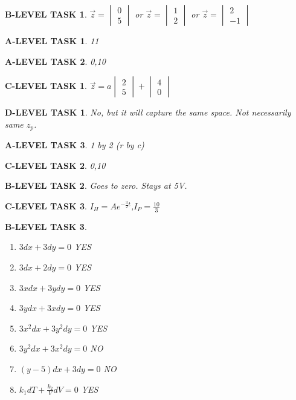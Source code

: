 \documentclass{book}
\numberwithin{equation}{section}
\newtheorem{alevel}{A-LEVEL TASK}
\newtheorem{blevel}{B-LEVEL TASK}
\newtheorem{clevel}{C-LEVEL TASK}
\newtheorem{dlevel}{D-LEVEL TASK}
\theoremstyle{definition}
\begin{document}
\begin{blevel}
$\vec{z}= \begin{vmatrix}0\\5\end{vmatrix}$ or
$\vec{z}= \begin{vmatrix}1\\2\end{vmatrix}$ or 
$\vec{z}= \begin{vmatrix}2\\-1\end{vmatrix}$ 
\end{blevel}
\begin{alevel}11\end{alevel}
\begin{alevel}0,10\end{alevel}
\begin{clevel}$\vec{z}= a\begin{vmatrix}2\\5\end{vmatrix}+\begin{vmatrix}4\\0\end{vmatrix}$ \end{clevel}

\begin{dlevel}No, but it will capture the same space. Not necessarily same $z_p$. \end{dlevel}
\begin{alevel}1 by 2 (r by c)\end{alevel}
\begin{clevel}0,10\end{clevel}
\begin{blevel}Goes to zero. Stays at 5V.\end{blevel}
\begin{clevel}$I_H=Ae^{-\frac{3}{2}t}$,$I_P=\frac{10}{3}$\end{clevel}

\begin{blevel}
\begin{enumerate}
\item $3dx + 3dy = 0$  YES
\item $3dx + 2dy = 0$  YES
\item $3xdx + 3ydy = 0$  YES
\item $3ydx + 3xdy = 0$  YES
\item $3x^2dx + 3y^2dy = 0$  YES
\item $3y^2dx + 3x^2dy = 0$  NO
\item $(y-5)dx + 3dy = 0$  NO
\item $k_1dT+\frac{k_2}{V}dV=0$  YES
\end{enumerate}\end{blevel}
\end{document}
